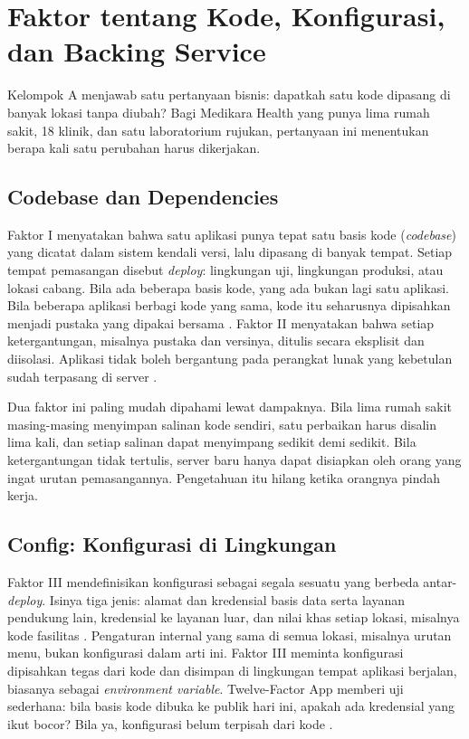 \section{Faktor tentang Kode, Konfigurasi, dan Backing Service}
\label{sec:ch05-kelompok-a}

Kelompok A menjawab satu pertanyaan bisnis: dapatkah satu kode dipasang di banyak lokasi
tanpa diubah? Bagi Medikara Health yang punya lima rumah sakit, 18 klinik, dan satu
laboratorium rujukan, pertanyaan ini menentukan berapa kali satu perubahan harus dikerjakan.

\subsection{Codebase dan Dependencies}

Faktor I menyatakan bahwa satu aplikasi punya tepat satu basis kode (\textit{codebase})
yang dicatat dalam sistem kendali versi, lalu dipasang di banyak tempat. Setiap tempat
pemasangan disebut \textit{deploy}: lingkungan uji, lingkungan produksi, atau lokasi
cabang. Bila ada beberapa basis kode, yang ada bukan lagi satu aplikasi. Bila beberapa
aplikasi berbagi kode yang sama, kode itu seharusnya dipisahkan menjadi pustaka yang dipakai
bersama \cite{twelvefactor}. Faktor II menyatakan bahwa setiap ketergantungan, misalnya
pustaka dan versinya, ditulis secara eksplisit dan diisolasi. Aplikasi tidak boleh
bergantung pada perangkat lunak yang kebetulan sudah terpasang di server
\cite{twelvefactor}.

Dua faktor ini paling mudah dipahami lewat dampaknya. Bila lima rumah sakit masing-masing
menyimpan salinan kode sendiri, satu perbaikan harus disalin lima kali, dan setiap salinan
dapat menyimpang sedikit demi sedikit. Bila ketergantungan tidak tertulis, server baru hanya
dapat disiapkan oleh orang yang ingat urutan pemasangannya. Pengetahuan itu hilang ketika
orangnya pindah kerja.

\subsection{Config: Konfigurasi di Lingkungan}

Faktor III mendefinisikan konfigurasi sebagai segala sesuatu yang berbeda
antar-\textit{deploy}. Isinya tiga jenis: alamat dan kredensial basis data serta layanan
pendukung lain, kredensial ke layanan luar, dan nilai khas setiap lokasi, misalnya kode
fasilitas \cite{twelvefactor}. Pengaturan internal yang sama di semua lokasi, misalnya
urutan menu, bukan konfigurasi dalam arti ini. Faktor III meminta konfigurasi dipisahkan
tegas dari kode dan disimpan di lingkungan tempat aplikasi berjalan, biasanya sebagai
\textit{environment variable}. Twelve-Factor App memberi uji sederhana: bila basis kode
dibuka ke publik hari ini, apakah ada kredensial yang ikut bocor? Bila ya, konfigurasi belum
terpisah dari kode \cite{twelvefactor}.

